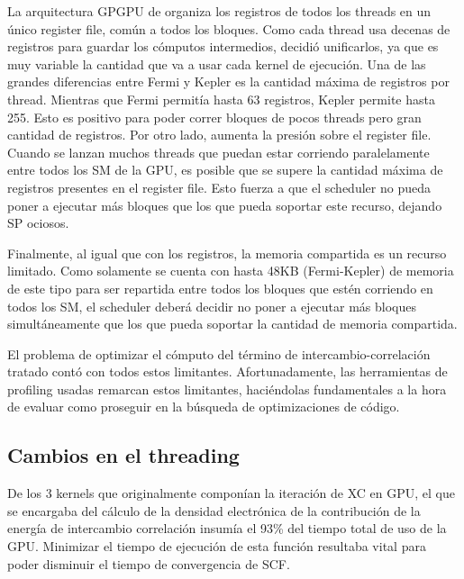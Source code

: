La arquitectura GPGPU de \nvidia organiza los registros de todos los threads en un \'unico
register file, com\'un a todos los bloques. Como cada thread usa decenas de registros para guardar
los c\'omputos intermedios, \nvidia decidi\'o unificarlos, ya que es muy variable la cantidad que va a usar
cada kernel de ejecuci\'on. Una de las grandes diferencias entre Fermi y Kepler es la cantidad m\'axima de
registros por thread. Mientras que Fermi permit\'ia hasta 63 registros, Kepler permite hasta 255. Esto
es positivo para poder correr bloques de pocos threads pero gran cantidad de registros. Por otro lado,
aumenta la presi\'on sobre el register file. Cuando se lanzan muchos threads
que puedan estar corriendo paralelamente entre todos los SM de la GPU, es posible que se supere
la cantidad m\'axima de registros presentes en el register file. Esto fuerza a que el scheduler
no pueda poner a ejecutar m\'as bloques que los que pueda soportar este recurso, dejando SP ociosos.

Finalmente, al igual que con los registros, la memoria compartida es un recurso limitado. Como
solamente se cuenta con hasta 48KB (Fermi-Kepler) de memoria de este tipo para ser repartida entre
todos los bloques que est\'en corriendo en todos los SM, el scheduler deber\'a decidir no poner a ejecutar
m\'as bloques simult\'aneamente que los que pueda soportar la cantidad de memoria compartida.

El problema de optimizar el c\'omputo del t\'ermino de intercambio-correlaci\'on tratado  cont\'o
con todos estos limitantes. Afortunadamente,
las herramientas de profiling usadas remarcan estos limitantes, haci\'endolas
fundamentales a la hora de evaluar como proseguir en la b\'usqueda de optimizaciones de c\'odigo.

\subsection{Cambios en el threading}

De los 3 kernels que originalmente compon\'ian la iteraci\'on de XC en GPU, el que se encargaba
del c\'alculo de la densidad electr\'onica de la contribuci\'on de la energ\'ia de intercambio correlaci\'on
insum\'ia el 93\% del tiempo total de uso de la GPU. Minimizar el tiempo de ejecuci\'on de
esta funci\'on resultaba vital para poder disminuir el tiempo de convergencia de SCF.

